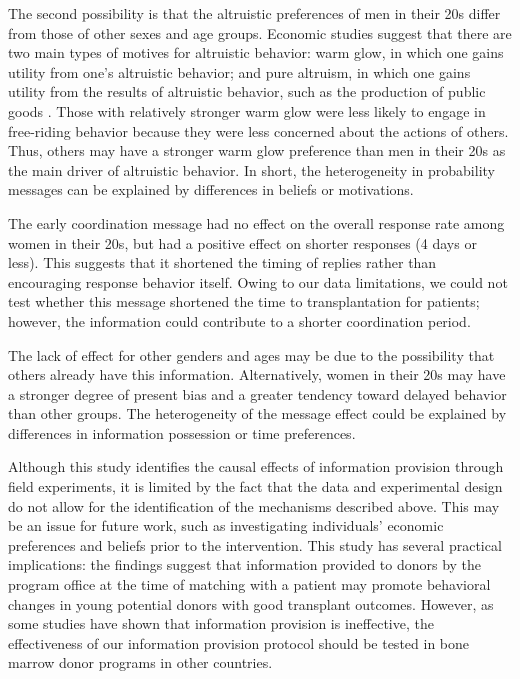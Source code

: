 \documentclass[12pt, a4paper]{article}
\begin{document}
The second possibility is that the altruistic preferences of men in their 20s differ from those of other sexes and age groups. Economic studies suggest that there are two main types of motives for altruistic behavior: warm glow, in which one gains utility from one's altruistic behavior; and pure altruism, in which one gains utility from the results of altruistic behavior, such as the production of public goods \citep{Andreoni1990}. Those with relatively stronger warm glow were less likely to engage in free-riding behavior because they were less concerned about the actions of others. Thus, others may have a stronger warm glow preference than men in their 20s as the main driver of altruistic behavior. In short, the heterogeneity in probability messages can be explained by differences in beliefs or motivations.

The early coordination message had no effect on the overall response rate among women in their 20s, but had a positive effect on shorter responses (4 days or less). This suggests that it shortened the timing of replies rather than encouraging response behavior itself. Owing to our data limitations, we could not test whether this message shortened the time to transplantation for patients; however, the information could contribute to a shorter coordination period.

The lack of effect for other genders and ages may be due to the possibility that others already have this information. Alternatively, women in their 20s may have a stronger degree of present bias and a greater tendency toward delayed behavior than other groups. The heterogeneity of the message effect could be explained by differences in information possession or time preferences.

Although this study identifies the causal effects of information provision through field experiments, it is limited by the fact that the data and experimental design do not allow for the identification of the mechanisms described above. This may be an issue for future work, such as investigating individuals' economic preferences and beliefs prior to the intervention. This study has several practical implications: the findings suggest that information provided to donors by the program office at the time of matching with a patient may promote behavioral changes in young potential donors with good transplant outcomes. However, as some studies \citep[for example,][]{Switzer2018} have shown that information provision is ineffective, the effectiveness of our information provision protocol should be tested in bone marrow donor programs in other countries.
\end{document}
